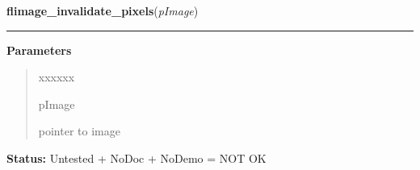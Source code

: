 \hspace{.8\funcindent}\begin{boxedminipage}{\funcwidth}

    \raggedright \textbf{flimage\_invalidate\_pixels}(\textit{pImage})

    \vspace{-1.5ex}

    \rule{\textwidth}{0.5\fboxrule}
\setlength{\parskip}{2ex}
\setlength{\parskip}{1ex}
      \textbf{Parameters}
      \vspace{-1ex}

      \begin{quote}
        \begin{Ventry}{xxxxxx}

          \item[pImage]

          pointer to image

        \end{Ventry}

      \end{quote}

\textbf{Status:} Untested + NoDoc + NoDemo = NOT OK



    \end{boxedminipage}

    \label{xformslib:library:flimage_open}

    \vspace{0.5ex}

